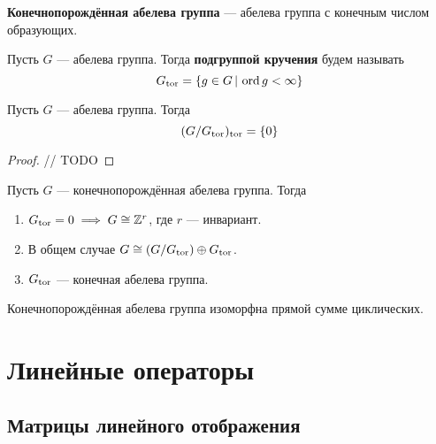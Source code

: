\documentclass[../main.tex]{subfiles}
\begin{document}
\begin{definition}
  \textbf{Конечнопорождённая абелева группа} --- абелева группа с конечным числом образующих.
\end{definition}

\begin{definition}
  Пусть $G$ --- абелева группа. Тогда \textbf{подгруппой кручения} будем называть
  \begin{equation*}
    G_{\operatorname{tor}} = \{g \in G \, | \, \operatorname{ord} g < \infty\}
  \end{equation*}
\end{definition}
\begin{remark}
  Пусть $G$ --- абелева группа. Тогда
  \begin{equation*}
    (G/G_{\operatorname{tor}})_{\operatorname{tor}} = \{0\}
  \end{equation*}
\end{remark}
\begin{proof}
  // TODO
\end{proof}

\begin{statement}
  Пусть $G$ --- конечнопорождённая абелева группа. Тогда
  \begin{enumerate}
    \item $G_{\operatorname{tor}} = 0 \implies G \cong \mathbb{Z}^r$, где $r$ --- инвариант.
    \item В общем случае $G \cong (G/G_{\operatorname{tor}}) \oplus G_{\operatorname{tor}}$.
    \item $G_{\operatorname{tor}}$ --- конечная абелева группа.
  \end{enumerate}
\end{statement}
\begin{corollary*}
  Конечнопорождённая абелева группа изоморфна прямой сумме циклических.
\end{corollary*}

\chapter{Линейные операторы}
\section{Матрицы линейного отображения}
\end{document}
